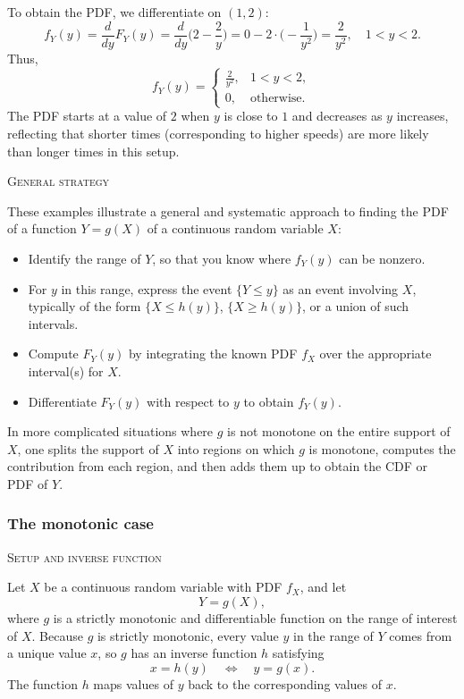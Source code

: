 To obtain the PDF, we differentiate on \((1,2)\):
\[
f_Y(y)
=
\frac{d}{dy}F_Y(y)
=
\frac{d}{dy}\Big(2 - \frac{2}{y}\Big)
=
0 - 2\cdot\Big(-\frac{1}{y^{2}}\Big)
=
\frac{2}{y^{2}},
\quad 1<y<2.
\]
Thus,
\[
f_Y(y)
=
\begin{cases}
\displaystyle \frac{2}{y^{2}}, & 1<y<2,\\[4pt]
0, & \text{otherwise}.
\end{cases}
\]
The PDF starts at a value of \(2\) when \(y\) is close to \(1\) and decreases as \(y\) increases, reflecting that shorter times (corresponding to higher speeds) are more likely than longer times in this setup.

\textsc{General strategy}

These examples illustrate a general and systematic approach to finding the PDF of a function \(Y = g(X)\) of a continuous random variable \(X\):
\begin{itemize}
\item Identify the range of \(Y\), so that you know where \(f_Y(y)\) can be nonzero.  
\item For \(y\) in this range, express the event \(\{Y \le y\}\) as an event involving \(X\), typically of the form \(\{X \le h(y)\}\), \(\{X \ge h(y)\}\), or a union of such intervals.  
\item Compute \(F_Y(y)\) by integrating the known PDF \(f_X\) over the appropriate interval(s) for \(X\).  
\item Differentiate \(F_Y(y)\) with respect to \(y\) to obtain \(f_Y(y)\).  
\end{itemize}
In more complicated situations where \(g\) is not monotone on the entire support of \(X\), one splits the support of \(X\) into regions on which \(g\) is monotone, computes the contribution from each region, and then adds them up to obtain the CDF or PDF of \(Y\).


\subsubsection{The monotonic case}

\textsc{Setup and inverse function}

Let \(X\) be a continuous random variable with PDF \(f_X\), and let
\[
Y = g(X),
\]
where \(g\) is a strictly monotonic and differentiable function on the range of interest of \(X\).  
Because \(g\) is strictly monotonic, every value \(y\) in the range of \(Y\) comes from a unique value \(x\), so \(g\) has an inverse function \(h\) satisfying
\[
x = h(y)
\quad\Longleftrightarrow\quad
y = g(x).
\]
The function \(h\) maps values of \(y\) back to the corresponding values of \(x\).

